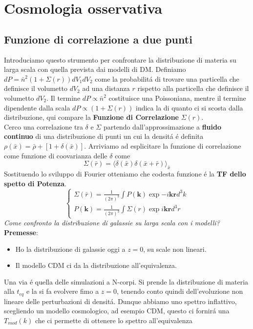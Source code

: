 \documentclass[12pt, a4paper]{article}
\begin{document}
\section{Cosmologia osservativa}
\subsection{Funzione di correlazione a due punti}
Introduciamo questo strumento per confrontare la distribuzione di materia su larga scala con quella prevista dai modelli di DM. Definiamo $dP=\bar{n}^2(1+\Sigma(r))dV_1 dV_2$ come la probabilit\'{a} di trovare una particella che definisce il volumetto $dV_2$ ad una distanza $r$ rispetto alla particella che definisce il volumetto $dV_2$. Il termine $dP\propto \bar{n}^2$ costituisce una Poissoniana, mentre il termine dipendente dalla scala $dP\propto(1+\Sigma(r))$ indica la di quanto ci si scosta dalla distribuzione, qui compare la \textbf{Funzione di Correlazione} $\Sigma(r)$.\\
Cerco una correlazione tra $\delta$ e $\Sigma$ partendo dall'approssimazione a \textbf{fluido continuo} di una distribuzione di punti un cui la densit\'{a} \'{e} definita $\rho(\bar{x})=\bar{\rho}+ [1+\delta(\bar{x})]$. Arriviamo ad esplicitare la funzione di correlazione come funzione di coovarianza delle $\delta$ come
\begin{equation}
\Sigma(\bar{r})=\langle \delta(\bar{x}) \delta(\bar{x}+\bar{r})\rangle_{\bar{x}}
\end{equation}
Sostituendo lo sviluppo di Fourier otteniamo che codesta funzione \'{e} la \textbf{TF dello spetto di Potenza}.
\begin{equation}
\begin{cases}
\Sigma(\bar{r})=\frac{1}{(2\pi)^3}\int P(\mathbf{k})\exp{-i\mathbf{k}\mathbf{r}}d^3k
\\
P(\mathbf{k})=\frac{1}{(2\pi)^3}\int \Sigma(r)\exp{i\mathbf{k}\mathbf{r}}d^3r
\end{cases}
\end{equation}
\textit{Come confronto la distribuzione di galassie su larga scala con i modelli?}\\
\textbf{Premesse}:
\begin{itemize}
\item Ho la distribuzione di galassie oggi a $z=0$, su scale non lineari.
\item Il modello CDM ci da la distribuzione all'equivalenza.
\end{itemize}
Una via \'{e} quella delle simulazioni a N-corpi. Si prende la distribuzione di materia alla  $t_{eq}$ e la si fa evolvere fimo a $z=0$, tenendo conto quindi dell'evoluzione non lineare delle perturbazioni di densit\'{a}. Dunque abbiamo uno spettro inflattivo, scegliendo un modello cosmologico, ad esempio CDM, questo ci fornir\'{a} una $T_{mod}(k)$ che ci permette di ottenere lo spettro all'equivalenza
\end{document}
